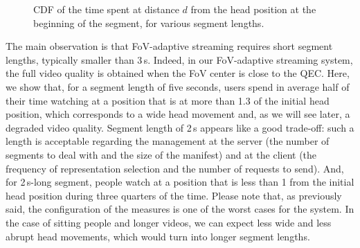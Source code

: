 \begin{figure}[htbp]
\centering

\caption{CDF of the time spent at distance $d$ from the head position at the beginning of the 
segment, for various segment lengths.}\label{cdf-dataset}
\end{figure}

The main observation is that FoV-adaptive streaming requires short segment lengths, typically 
smaller than 3\,s. Indeed, in our FoV-adaptive streaming system, the full video quality is obtained
when the FoV center is close to the QEC. Here, we show that, for a segment length of five seconds,
users spend in average half of their time watching at a position that is at more than 
1.3 of the initial head position,
which corresponds to a wide head movement and, as we will see later, a degraded video quality.
Segment length of 2\,s appears like a good trade-off: such a length is acceptable regarding the
management at the server (the number of segments to deal with and the size of the manifest)
and at the client (the frequency of representation selection and the number of requests
to send). And, for 2\,s-long segment, people watch
at a position that is less than 1 from the initial head position during three quarters 
of the time. Please note that, as previously said, the configuration of the measures is one of
the worst cases for the system. In the case of sitting people and longer videos, we can expect less
wide and less abrupt head movements, which would turn into longer segment lengths.